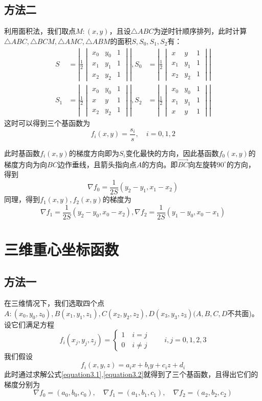 \documentclass[12pt,a4paper]{article}
\begin{document}
\subsection{方法二}
利用面积法，我们取点$M:(x,y)$，且设$\triangle ABC$为逆时针顺序排列，此时计算$\triangle ABC,\triangle BCM,\triangle AMC,\triangle ABM$的面积$S,S_0,S_1,S_2$有：
\begin{equation*}\begin{aligned}
S&=\left| \frac{1}{2} \begin{vmatrix}
x_0&y_0&1\\x_1&y_1&1\\x_2&y_2&1\end{vmatrix}\right|,S_0&=\left| \frac{1}{2} \begin{vmatrix}
x&y&1\\x_1&y_1&1\\x_2&y_2&1\end{vmatrix}\right|\\
S_1&=\left| \frac{1}{2} \begin{vmatrix}
x_0&y_0&1\\x&y&1\\x_2&y_2&1\end{vmatrix}\right|,S_2&=\left| \frac{1}{2} \begin{vmatrix}
x_0&y_0&1\\x_1&y_1&1\\x&y&1\end{vmatrix}\right|
\end{aligned}
\end{equation*}
这时可以得到三个基函数为
\begin{equation}
f_i(x,y)=\frac{s_i}{s},\quad i=0,1,2
\end{equation}

此时基函数$f_i(x,y)$的梯度方向即为$S_i$变化最快的方向，因此基函数$f_0(x,y)$的梯度方向为向$BC$边作垂线，且箭头指向点$A$的方向。即$\overrightarrow {B C}$向左旋转$90^\circ$的方向，得到$$\nabla f_0=\frac{1}{2S}(y_2-y_1,x_1-x_2)$$
同理，得到$f_1(x,y),f_2(x,y)$的梯度为$$\nabla f_1=\frac{1}{2S}(y_2-y_0,x_0-x_2),\nabla f_2=\frac{1}{2S}(y_1-y_0,x_0-x_1)$$
\section{三维重心坐标函数}
\subsection{方法一}
在三维情况下，我们选取四个点$A:(x_0,y_0,z_0),B(x_1,y_1,z_1),C(x_2,y_2,z_2),D(x_3,y_3,z_3)(A,B,C,D$不共面)。设它们满足方程\begin{equation}
f_i(x_j,y_j,z_j)=\begin{cases}1 \quad i=j
\\ 0\quad i\neq j\end{cases}\qquad i,j=0,1,2,3
\label{equation3.1}
\end{equation}
我们假设\begin{equation}
f_i(x,y,z)=a_ix+b_iy+c_iz+d_i
\label{equation3.2}
\end{equation}
此时通过求解公式\ref{equation3.1},\ref{equation3.2}就得到了三个基函数，且得出它们的梯度分别为$$\nabla f_0=(a_0,b_0,c_0),\quad \nabla f_1=(a_1,b_1,c_1),\quad \nabla f_2=(a_2,b_2,c_2)$$
\end{document}
